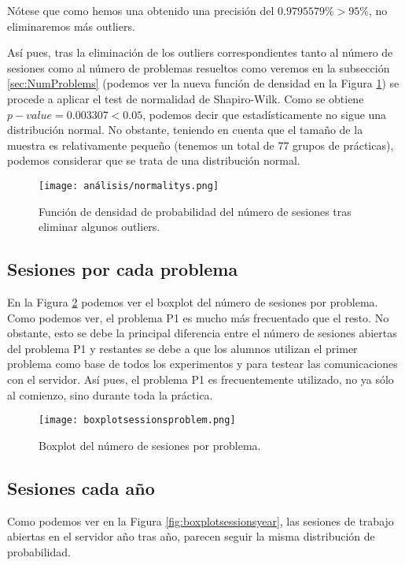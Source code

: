 Nótese que como hemos una obtenido una precisión del $0.9795579\% > 95\%$, no eliminaremos más outliers.

Así pues, tras la eliminación de los outliers correspondientes tanto al número de sesiones como al número de problemas resueltos como veremos en la subsección \ref{sec:NumProblems} (podemos ver la nueva función de densidad en la Figura \ref{fig:normalitys}) se procede a aplicar el test de normalidad de Shapiro-Wilk. Como se obtiene $p-value = 0.003307 < 0.05$, podemos decir que estadísticamente no sigue una distribución normal. No obstante, teniendo en cuenta que el tamaño de la muestra es relativamente pequeño (tenemos un total de $77$ grupos de prácticas), podemos considerar que se trata de una distribución normal.

\begin{figure}[H]
    \centering
    \texttt{[image: análisis/normalitys.png]}
    \caption{Función de densidad de probabilidad del número de sesiones tras eliminar algunos outliers.}
    \label{fig:normalitys}
\end{figure}

\subsection{Sesiones por cada problema}

En la Figura \ref{fig:boxplotsessionsproblem} podemos ver el boxplot del número de sesiones por problema. Como podemos ver, el problema P1 es mucho más frecuentado que el resto. No obstante, esto se debe la principal diferencia entre el número de sesiones abiertas del problema P1 y restantes se debe a que los alumnos utilizan el primer problema como base de todos los experimentos y para testear las comunicaciones con el servidor. Así pues, el problema P1 es frecuentemente utilizado, no ya sólo al comienzo, sino durante toda la práctica.

\begin{figure}[H]
    \centering
    \texttt{[image: boxplotsessionsproblem.png]}
    \caption{Boxplot del número de sesiones por problema.}
    \label{fig:boxplotsessionsproblem}
\end{figure}

\subsection{Sesiones cada año}\label{sec:ANOVANumSessions}

Como podemos ver en la Figura \ref{fig:boxplotsessionsyear}, las sesiones de trabajo abiertas en el servidor año tras año, parecen seguir la misma distribución de probabilidad.

